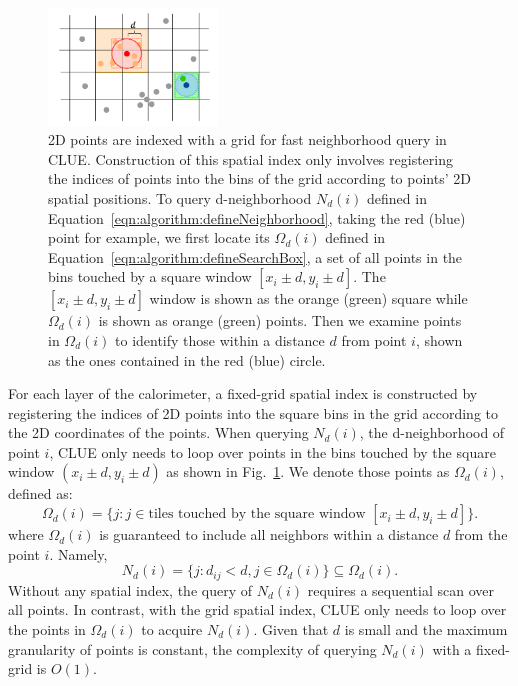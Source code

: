 \begin{figure}[ht]
    \centering
    \includegraphics[width=0.4\textwidth]{chapters/HGCal/figures/clue/Figure1.png}
    \caption{2D points are indexed with a grid for fast neighborhood query in CLUE. Construction of this spatial index only involves registering the indices of points into the bins of the grid according to points' 2D spatial positions. To query d-neighborhood $N_d(i)$ defined in Equation~\ref{eqn:algorithm:defineNeighborhood}, taking the red (blue) point for example, we first locate its $\Omega_d(i)$ defined in Equation~\ref{eqn:algorithm:defineSearchBox}, a set of all points in the bins touched by a square window $[x_i\pm d,y_i\pm d]$. The $[x_i\pm d,y_i\pm d]$ window is shown as the orange (green) square while $\Omega_d(i)$ is shown as orange (green) points. Then we examine points in $\Omega_d(i)$ to identify those within a distance $d$ from point $i$, shown as the ones contained in the red (blue) circle.}
    \label{fig:algorithm:searchBox}
\end{figure}


For each layer of the calorimeter, a fixed-grid spatial index is constructed by registering the indices of 2D points into the square bins in the grid according to the 2D coordinates of the points. When querying $N_d(i)$, the d-neighborhood of point $i$, CLUE only needs to loop over points in the bins touched by the square window $(x_i\pm d,y_i\pm d)$ as shown in Fig.~\ref{fig:algorithm:searchBox}. We denote those points as $\Omega_d(i)$, defined as:
\begin{equation} \label{eqn:algorithm:defineSearchBox}
    \Omega_d(i) = \{j : j \in \textrm{tiles touched by the square window } [x_i\pm d,y_i\pm d] \}.
\end{equation}
\noindent where $\Omega_d(i)$ is guaranteed to include all neighbors within a distance $d$ from the point $i$. Namely, 
\begin{equation} \label{eqn:algorithm:defineNeighborhood}
    N_d(i)=\{j: d_{ij}<d, j \in \Omega_d(i) \} \subseteq \Omega_d(i).
\end{equation}
\noindent Without any spatial index, the query of $N_d(i)$ requires a sequential scan over all points. In contrast, with the grid spatial index, CLUE only needs to loop over the points in $\Omega_d(i)$ to acquire $N_d(i)$. Given that $d$ is small and the maximum granularity of points is constant, the complexity of querying $N_d(i)$ with a fixed-grid is $O(1)$.


